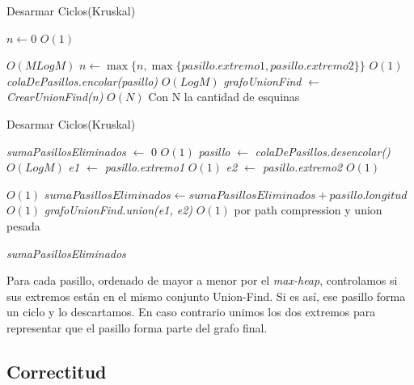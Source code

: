 \begin{algorithm}[H]
\caption{Desarmar Ciclos(Kruskal)}\label{init-ej3}
\begin{algorithmic}[6]


\State $n \gets 0$		\Comment $O(1)$

 	\Comment $O(M Log M)$
  \State $n \gets \max\{n, \max\{pasillo.extremo1, pasillo.extremo2\}\}$ \Comment $O(1)$
  \State \textit{colaDePasillos.encolar(pasillo)}  \Comment $O(Log M)$
\EndFor
\State \textit{grafoUnionFind} $\gets$ \textit{CrearUnionFind(n)} \Comment $O(N)$ Con N la cantidad de esquinas

\EndProcedure
\end{algorithmic}
\end{algorithm}

\begin{algorithm}[H]
\caption{Desarmar Ciclos(Kruskal)}\label{alg-ej3}
\begin{algorithmic}[7]
\State \textit{sumaPasillosEliminados} $\gets$ 0 		\Comment $O(1)$
  \State \textit{pasillo} $\gets$ \textit{colaDePasillos.desencolar() }		\Comment $O(Log M)$
  \State \textit{e1 $\gets$ pasillo.extremo1}		\Comment $O(1)$
  \State \textit{e2 $\gets$ pasillo.extremo2}		\Comment $O(1)$
  
  
   	\Comment $O(1)$		
    \State $sumaPasillosEliminados \gets sumaPasillosEliminados + pasillo.longitud$	\Comment $O(1)$
  \Else
    \State \textit{grafoUnionFind.union(e1, e2) }		\Comment $O(1)$ por path compression y union pesada
  \EndIf

\EndWhile

\Return \textit{sumaPasillosEliminados}
\EndProcedure
\end{algorithmic}
\end{algorithm}

Para cada pasillo, ordenado de mayor a menor por el \textit{max-heap}, controlamos si sus extremos están en el mismo conjunto Union-Find. Si es así, ese pasillo forma un ciclo y lo descartamos. En caso contrario unimos los dos extremos para representar que el pasillo forma parte del grafo final.

\subsection{Correctitud}

